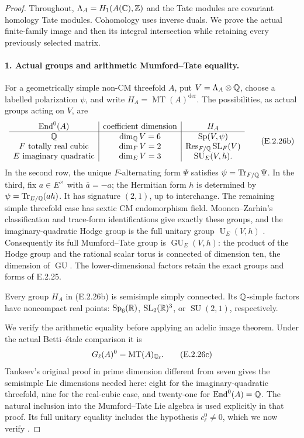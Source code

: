\begin{proof}
Throughout, \(\Lambda_A=H_1(A(\mathbb C),\mathbb Z)\) and the Tate modules
are covariant homology Tate modules. Cohomology uses inverse duals.
We prove the actual finite-family image and then its integral
intersection while retaining every previously selected matrix.

\paragraph{1. Actual groups and arithmetic Mumford--Tate equality.}
For a geometrically simple non-CM threefold \(A\), put
\(V=\Lambda_A\otimes\mathbb Q\), choose a labelled polarization \(\psi\),
and write \(H_A=\operatorname{MT}(A)^{\mathrm{der}}\).
The possibilities, as actual groups acting on \(V\), are
\[
\begin{array}{c|c|c}
 \operatorname{End}^0(A)&\text{coefficient dimension}&H_A\\ \hline
 \mathbb Q&\dim_{\mathbb Q}V=6&\operatorname{Sp}(V,\psi)\\
 F\text{ totally real cubic}&\dim_FV=2
      &\operatorname{Res}_{F/\mathbb Q}\operatorname{SL}_F(V)\\
 E\text{ imaginary quadratic}&\dim_EV=3
      &\operatorname{SU}_E(V,h).
\end{array}
\tag{E.2.26b}
\]
In the second row, the unique \(F\)-alternating form \(\Psi\)
satisfies \(\psi=\operatorname{Tr}_{F/\mathbb Q}\Psi\). In the third,
fix \(a\in E^\times\) with \(\bar a=-a\); the Hermitian form
\(h\) is determined by \(\psi=\operatorname{Tr}_{E/\mathbb Q}(a h)\).
It has signature \((2,1)\), up to interchange. The remaining simple
threefold case has sextic CM endomorphism field. Moonen--Zarhin's
classification and trace-form identifications give exactly these
groups, and the imaginary-quadratic Hodge group is the full unitary
group \(\operatorname U_E(V,h)\)
\cite[Section 2.3 and Proposition 2.4, author p.~9;
Theorem 2.7, author p.~10]{GenMoonenZarhin1999}.
Consequently its full Mumford--Tate group is
\(\operatorname{GU}_E(V,h)\): the product of the Hodge group and
the rational scalar torus is connected of dimension ten, the
dimension of \(\operatorname{GU}\). The lower-dimensional factors
retain the exact groups and forms of E.2.25.

Every group \(H_A\) in (E.2.26b) is semisimple simply connected.
Its \(\mathbb Q\)-simple factors have noncompact real points:
\(\operatorname{Sp}_6(\mathbb R)\), \(\operatorname{SL}_2(\mathbb R)^3\),
or \(\operatorname{SU}(2,1)\), respectively.

We verify the arithmetic equality before applying an adelic image
theorem. Under the actual Betti--\'{e}tale comparison it is
\[
 G_\ell(A)^0=\operatorname{MT}(A)_{\mathbb Q_\ell}.
 \tag{E.2.26c}
\]
Tankeev's original proof in prime dimension different from seven
gives the semisimple Lie dimensions needed here: eight for the
imaginary-quadratic threefold, nine for the real-cubic case, and
twenty-one for \(\operatorname{End}^0(A)=\mathbb Q\). The natural inclusion into the
Mumford--Tate Lie algebra is used explicitly in that proof. Its full
unitary equality includes the hypothesis \(c_\ell^0\ne0\), which
we now verify
\cite[Lemma 3 and proof, pp.~532--535; type-I cases,
pp.~535--539]{GenTankeev1988}.


\end{proof}
